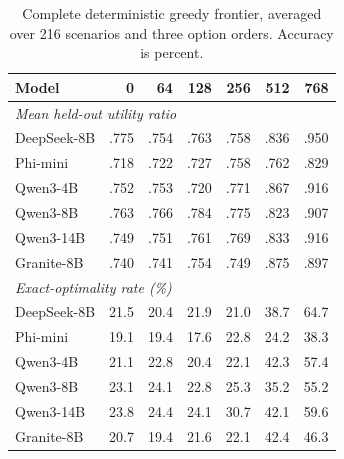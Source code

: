 \begin{table}[H]
\centering
\caption{Complete deterministic greedy frontier, averaged over 216 scenarios and three option orders. Accuracy is percent.}
\label{tab:fullgreedy}
\scriptsize
\setlength{\tabcolsep}{2.6pt}
\begin{tabular}{lrrrrrr}
\toprule
Model & 0 & 64 & 128 & 256 & 512 & 768 \\
\midrule
\multicolumn{7}{l}{\emph{Mean held-out utility ratio}}\\
DeepSeek-8B & .775 & .754 & .763 & .758 & .836 & .950 \\
Phi-mini & .718 & .722 & .727 & .758 & .762 & .829 \\
Qwen3-4B & .752 & .753 & .720 & .771 & .867 & .916 \\
Qwen3-8B & .763 & .766 & .784 & .775 & .823 & .907 \\
Qwen3-14B & .749 & .751 & .761 & .769 & .833 & .916 \\
Granite-8B & .740 & .741 & .754 & .749 & .875 & .897 \\
\midrule
\multicolumn{7}{l}{\emph{Exact-optimality rate (\%)}}\\
DeepSeek-8B & 21.5 & 20.4 & 21.9 & 21.0 & 38.7 & 64.7 \\
Phi-mini & 19.1 & 19.4 & 17.6 & 22.8 & 24.2 & 38.3 \\
Qwen3-4B & 21.1 & 22.8 & 20.4 & 22.1 & 42.3 & 57.4 \\
Qwen3-8B & 23.1 & 24.1 & 22.8 & 25.3 & 35.2 & 55.2 \\
Qwen3-14B & 23.8 & 24.4 & 24.1 & 30.7 & 42.1 & 59.6 \\
Granite-8B & 20.7 & 19.4 & 21.6 & 22.1 & 42.4 & 46.3 \\
\bottomrule
\end{tabular}
\end{table}

